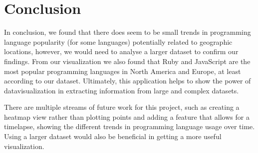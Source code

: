 \documentclass[11pt]{article}
\begin{document}
\section{Conclusion}
In conclusion, we found that there does seem to be small trends in programming language popularity (for some languages) potentially related to geographic locations, however, we would need to analyse a larger dataset to confirm our findings. From our visualization we also found that Ruby and JavaScript are the most popular programming languages in North America and Europe, at least according to our dataset. Ultimately, this application helps to show the power of datavisualization in extracting information from large and complex datasets.

There are multiple streams of future work for this project, such as creating a heatmap view rather than plotting points and adding a feature that allows for a timelapse, showing the different trends in programming language usage over time. Using a larger dataset would also be beneficial in getting a more useful visualization.

%
%
\end{document}
